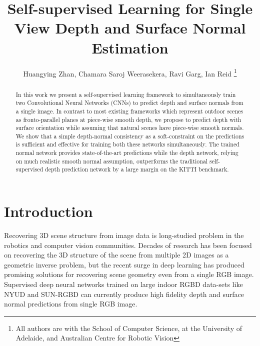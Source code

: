 \documentclass[letterpaper, 10 pt, conference]{ieeeconf}
\title{\LARGE \bf
Self-supervised Learning for Single View Depth and Surface Normal Estimation}
\author{Huangying Zhan, Chamara Saroj Weerasekera, Ravi Garg, Ian Reid
\thanks{All authors are with the School of Computer Science, at the University
of Adelaide, and Australian Centre for Robotic Vision}}
\begin{document}
\maketitle
\thispagestyle{empty}
\pagestyle{empty}

\newcommand{\Ravi}[1]{\textcolor{red}{#1}}
\newcommand{\HY}[1]{\textcolor{blue}{#1}}
\newcommand{\Saroj}[1]{\textcolor{green}{#1}}
\newcommand{\etal}{\textit{et al}.}
\begin{abstract}
In this work we present a self-supervised learning framework to simultaneously train two Convolutional Neural Networks (CNNs) to predict depth and surface normals from a single image. In contrast to most existing frameworks which represent outdoor scenes as fronto-parallel planes at piece-wise smooth depth, we propose to predict depth with surface orientation while assuming that natural scenes have piece-wise smooth normals. We show that a simple depth-normal consistency as a soft-constraint on the predictions is sufficient and effective for training both these networks simultaneously. The trained normal network provides state-of-the-art predictions while the depth network, relying on much realistic smooth normal assumption, outperforms the traditional self-supervised depth prediction network by a large margin on the KITTI benchmark.
\end{abstract}





\section{Introduction} \label{Sec:intro}
Recovering 3D scene structure from image data is long-studied problem in the robotics and computer vision communities. Decades of research has been focused on recovering the 3D structure of the scene from multiple 2D images as a geometric inverse problem, but the recent surge in deep learning has produced promising solutions for recovering scene geometry even from a single RGB image. Supervised deep neural networks trained on large indoor RGBD data-sets like NYUD \cite{Silberman2012nyuv2} and SUN-RGBD \cite{Song_2015_CVPR} can currently produce high fidelity depth and surface normal predictions from single RGB image. 
\end{document}
